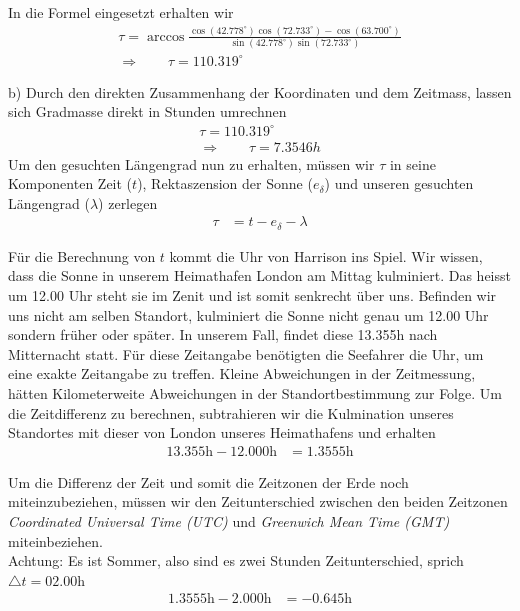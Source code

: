 \begin{refsection}
In die Formel eingesetzt erhalten wir
\begin{align*}
\tau = \arccos 
\frac{ \cos(42.778^{\circ}) \cos(72.733^{\circ}) - \cos(63.700^{\circ})} {\sin(42.778^{\circ})\sin(72.733^{\circ})} \\
\Rightarrow \quad \quad
\tau = 110.319^{\circ} 
\end{align*}

b) \quad  Durch den direkten Zusammenhang der Koordinaten und dem Zeitmass, lassen sich Gradmasse direkt in Stunden umrechnen
\begin{align*}
\tau = 110.319^{\circ} \\
\Rightarrow \quad \quad
\tau = 7.3546h
\end{align*}
Um den gesuchten Längengrad nun zu erhalten, müssen wir $\tau$ in seine Komponenten Zeit ($t$), Rektaszension der Sonne ($e_\delta$) und unseren gesuchten Längengrad ($\lambda$) zerlegen
\begin{align*}
\tau &= t - e_\delta - \lambda 
\end{align*}


Für die Berechnung von $t$ kommt die Uhr von Harrison ins Spiel. Wir wissen, dass die Sonne in unserem Heimathafen London am Mittag kulminiert. Das heisst um 12.00 Uhr steht sie im Zenit und ist somit senkrecht über uns. 
Befinden wir uns nicht am selben Standort, kulminiert die Sonne nicht genau um 12.00 Uhr sondern früher oder später.
In unserem Fall, findet diese 13.355h nach Mitternacht statt. Für diese Zeitangabe benötigten die Seefahrer die Uhr, um eine exakte Zeitangabe zu treffen. Kleine Abweichungen in der Zeitmessung, hätten Kilometerweite Abweichungen in der Standortbestimmung zur Folge.
Um die Zeitdifferenz zu berechnen, subtrahieren wir die Kulmination unseres Standortes mit dieser von London unseres Heimathafens und erhalten
\begin{align*}
13.355 \text{h} - 12.000 \text{h} &= 1.3555 \text{h}
\end{align*}

Um die Differenz der Zeit und somit die Zeitzonen der Erde noch miteinzubeziehen, müssen wir den Zeitunterschied zwischen den beiden Zeitzonen \textit{Coordinated Universal Time (UTC)} und \textit{Greenwich Mean Time (GMT)} miteinbeziehen. \\
Achtung: Es ist Sommer, also sind es zwei Stunden Zeitunterschied, sprich $\triangle{t}=02.00$h
\begin{align*}
1.3555 \text{h} - 2.000 \text{h} &= -0.645 \text{h}
\end{align*}


\end{refsection}
